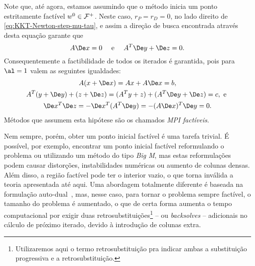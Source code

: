 Note que, até agora, estamos assumindo que o método inicia  um ponto estritamente
factível $w^0 \in \mathcal{F}^+$. Neste caso, $r_P = r_D = 0$, no lado
direito de \eqref{eq:KKT-Newton-step-mu-tau}, e assim a direção de busca
encontrada através desta equação garante que
\begin{equation}
\label{eq:fact-direction}
A\Dex = 0 \quad \text{ e } \quad A^T\Dey + \Dez = 0.
\end{equation}
Consequentemente a factibilidade de todos os iterados é garantida, pois para
$\al =1$ valem as seguintes igualdades:
\begin{gather*}
A(x + \Dex) = Ax + A\Dex = b, \\
A^T(y+\Dey) + (z + \Dez) = (A^Ty + z) + (A^T\Dey + \Dez) = c, \text{ e }\\
\Dex^T \Dez  = - \Dex^T (A^T\Dey) = - (A\Dex)^T\Dey = 0.
\end{gather*}
Métodos que assumem esta hipótese são os chamados \emph{\ac{MPI} factíveis}. 






Nem sempre, porém,  obter um ponto inicial factível é uma tarefa trivial.
É possível, por exemplo, encontrar um ponto inicial factível reformulando o
problema  ou utilizando um método do tipo \emph{Big M}, mas estas
reformulações podem causar distorções, instabilidades numéricas ou aumento de
colunas densas.  Além disso, a região factível pode ter o interior vazio, o que
torna inválida a teoria apresentada até aqui. Uma abordagem totalmente diferente
é baseada na formulação
auto-dual~\cite{Ye:1994gq}, mas, nesse caso, para tornar o problema sempre
factível,  o tamanho do problema é aumentado, o que de certa forma aumenta o tempo computacional por exigir duas retrosubstituições\footnote{Utilizaremos aqui o termo retrosubstituição pra indicar ambas a substituição progressiva e a retrosubstituição.} -- ou
\emph{backsolves} -- adicionais no cálculo de próximo iterado, devido à
introdução de colunas extra.

